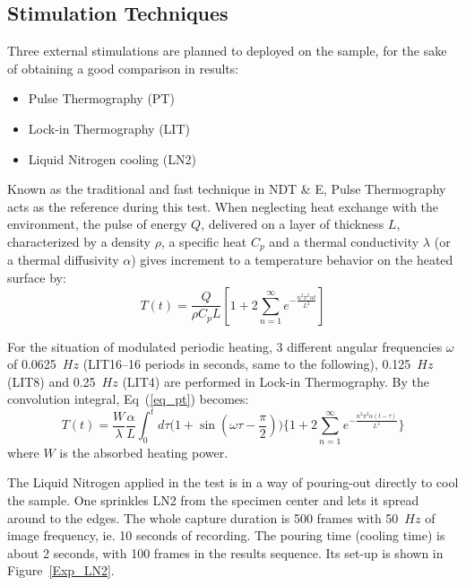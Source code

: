 \documentclass[]{spie}  %
\begin{document}
\subsection{Stimulation Techniques} %
\label{sub:stimulation_techniques}
Three external stimulations are planned to deployed on the sample, for the sake of  obtaining a good comparison in results: 
\begin{itemize}
   \item Pulse Thermography (PT) 
   \item Lock-in Thermography (LIT)
   \item Liquid Nitrogen cooling (LN2)
\end{itemize}
Known as the traditional and fast technique in NDT \& E, Pulse Thermography acts as the reference during this test. When neglecting heat exchange with the environment, the pulse of energy $Q$, delivered on a layer of thickness $L$, characterized by a density $\rho$, a specific heat $C_p$ and a thermal conductivity $\lambda$ (or a thermal diffusivity $\alpha$) gives increment to a temperature behavior on the heated surface by:
\begin{equation}
   T(t) = \frac{Q}{\rho C_p L}[1+2\sum_{n=1}^{\infty} e^{-\frac{n^2 \pi ^2\alpha t}{L^2}}]
   \label{eq_pt}
\end{equation}

For the situation of modulated periodic heating, 3 different angular frequencies $\omega$ of 0.0625~$Hz$ (LIT16--16 periods in seconds, same to the following), 0.125~$Hz$ (LIT8) and 0.25~$Hz$ (LIT4) are performed in Lock-in Thermography. 
By the convolution integral, Eq~(\ref{eq_pt}) becomes:
\begin{equation}
   T(t) = \frac{W}{\lambda}\frac{\alpha}{L}\int_0^t d\tau \Big(1+\sin(\omega \tau - \frac{\pi}{2})\Big)\Big\{1+2\sum_{n=1}^{\infty} e^{-\frac{n^2 \pi ^2\alpha(t-\tau)}{L^2}}\Big\}
\end{equation}
where $W$ is the absorbed heating power.

The Liquid Nitrogen applied in the test is in a way of pouring-out directly to cool the sample. One sprinkles LN2 from the specimen center and lets it spread around to the edges. The whole capture duration is 500 frames with 50~$Hz$ of image frequency, ie. 10 seconds of recording. The pouring time (cooling time) is about 2 seconds, with 100 frames in the results sequence. Its set-up is shown in Figure~\ref{Exp_LN2}.
\end{document}
